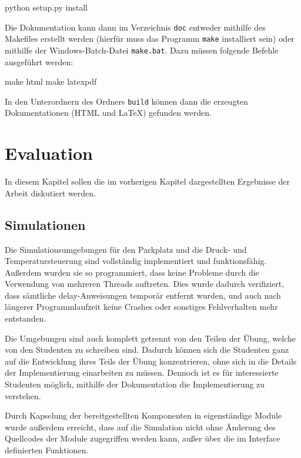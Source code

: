 \documentclass[oneside]{elaboration}
\begin{document}
\begin{bashcode}
    python setup.py install
\end{bashcode}

Die Dokumentation kann dann im Verzeichnis \texttt{doc} entweder mithilfe des
Makefiles erstellt werden (hierfür muss das Programm \texttt{make} installiert
sein) oder mithilfe der Windows-Batch-Datei \texttt{make.bat}. Dazu
müssen folgende Befehle ausgeführt werden:

\begin{bashcode}
    make html
    make latexpdf
\end{bashcode}

In den Unterordnern des Ordners \texttt{build} können dann die erzeugten
Dokumentationen (HTML und LaTeX) gefunden werden.

\chapter{Evaluation}
\label{chp:evaluation}

In diesem Kapitel sollen die im vorherigen Kapitel dargestellten Ergebnisse der
Arbeit diskutiert werden.

\section{Simulationen}
\label{sec:simulationen}

Die Simulationsumgebungen für den Parkplatz und die Druck- und
Temperatursteuerung sind vollständig implementiert und funktionsfähig. Außerdem
wurden sie so programmiert, dass keine Probleme durch die Verwendung von
mehreren Threads auftreten. Dies wurde dadurch verifiziert, dass sämtliche
delay-Anweisungen temporär entfernt wurden, und auch nach längerer
Programmlaufzeit keine Crashes oder sonstiges Fehlverhalten mehr entstanden.

Die Umgebungen sind auch komplett getrennt von den Teilen der Übung, welche von
den Studenten zu schreiben sind. Dadurch können sich die Studenten ganz auf die
Entwicklung ihres Teils der Übung konzentrieren, ohne sich in die Details der
Implementierung einarbeiten zu müssen. Dennoch ist es für interessierte
Studenten möglich, mithilfe der Dokumentation die Implementierung zu verstehen.

Durch Kapselung der bereitgestellten Komponenten in eigenständige Module wurde
außerdem erreicht, dass auf die Simulation nicht ohne Änderung des Quellcodes
der Module zugegriffen werden kann, außer über die im Interface definierten
Funktionen.
\end{document}
